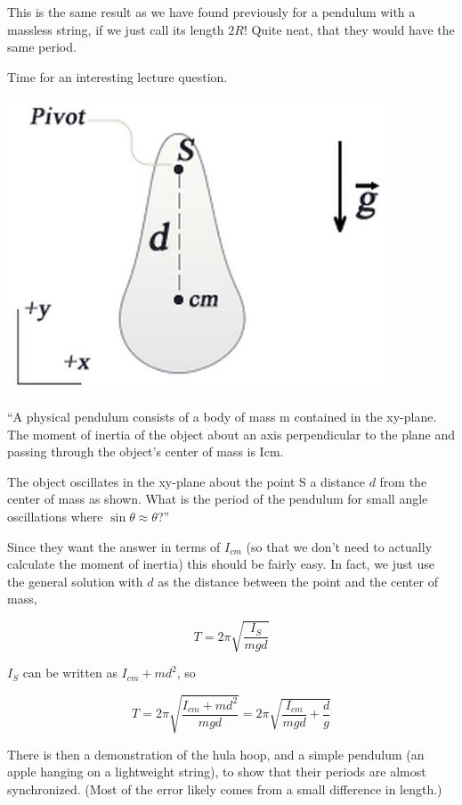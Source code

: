 \documentclass[8.01x]{subfiles}
\begin{document}
This is the same result as we have found previously for a pendulum with a massless string, if we just call its length $2 R$! Quite neat, that they would have the same period.	

Time for an interesting lecture question.

\begin{center}
\includegraphics[scale=0.5]{Graphics/lec21_physical_pendulum_2}
\end{center}

``A physical pendulum consists of a body of mass m contained in the xy-plane. The moment of inertia of the object about an axis perpendicular to the plane and passing through the object's center of mass is Icm.

The object oscillates in the xy-plane about the point S a distance $d$ from the center of mass as shown. What is the period of the pendulum for small angle oscillations where $\sin\theta \approx \theta$?''

Since they want the answer in terms of $I_{cm}$ (so that we don't need to actually calculate the moment of inertia) this should be fairly easy. In fact, we just use the general solution with $d$ as the distance between the point and the center of mass,

\begin{equation}
T = 2 \pi \sqrt{\frac{I_{S}}{m g d}}
\end{equation}

$I_S$ can be written as $I_{cm} + m d^2$, so

\begin{equation}
T = 2 \pi \sqrt{\frac{I_{cm} + m d^2}{m g d}} = 2 \pi \sqrt{\frac{I_{cm}}{m g d} + \frac{d}{g}}
\end{equation}

There is then a demonstration of the hula hoop, and a simple pendulum (an apple hanging on a lightweight string), to show that their periods are almost synchronized. (Most of the error likely comes from a small difference in length.)
\end{document}
